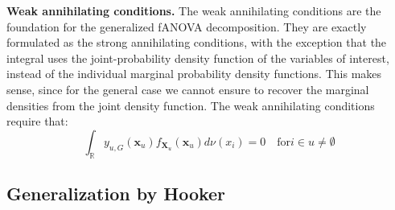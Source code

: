 \begin{proposition}
    \textbf{Weak annihilating conditions.}
    The weak annihilating conditions are the foundation for the generalized fANOVA decomposition. They are exactly formulated as the strong annihilating conditions, with the exception that the integral uses the joint-probability density function of the variables of interest, instead of the individual marginal probability density functions.
    This makes sense, since for the general case we cannot ensure to recover the marginal densities from the joint density function. {\color{red}{Is this really the reason? Or is the reason: When there are dependencies between variables then the individual pdfs would not assign the ``correct weight'' as they ignore the dependence between features in $u$.}}
    The weak annihilating conditions require that:
\begin{equation}
    \int_{\mathbb{R}} y_{u, G}(\boldsymbol{x}_u) f_{\boldsymbol{X}_u}(\boldsymbol{x}_u) d\nu (x_i) = 0 \quad \text{for} i \in u \neq \emptyset
\end{equation}
\end{proposition}

\begin{proposition}
\end{proposition}

\begin{proposition}
\end{proposition}


\subsection{Generalization by Hooker}



